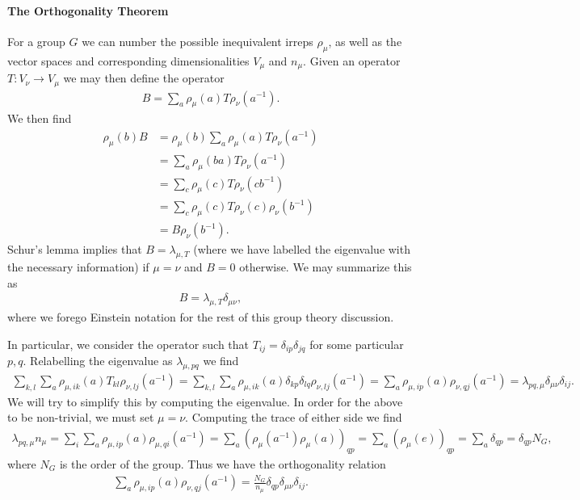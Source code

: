 \paragraph{The Orthogonality Theorem}
For a group $G$ we can number the possible inequivalent irreps $\rho_{\mu}$, as well as the vector spaces and corresponding dimensionalities $V_{\mu}$ and $n_{\mu}$. Given an operator $T: V_{\nu}\to V_{\mu}$ we may then define the operator
\begin{align*}
	B = \sum\limits_{a}\rho_{\mu}(a)T\rho_{\nu}(a^{-1}).
\end{align*}
We then find
\begin{align*}
	\rho_{\mu}(b)B &= \rho_{\mu}(b)\sum\limits_{a}\rho_{\mu}(a)T\rho_{\nu}(a^{-1}) \\
	               &= \sum\limits_{a}\rho_{\mu}(ba)T\rho_{\nu}(a^{-1}) \\
	               &= \sum\limits_{c}\rho_{\mu}(c)T\rho_{\nu}(cb^{-1}) \\
	               &= \sum\limits_{c}\rho_{\mu}(c)T\rho_{\nu}(c)\rho_{\nu}(b^{-1}) \\
	               &= B\rho_{\nu}(b^{-1}).
\end{align*}
Schur's lemma implies that $B = \lambda_{\mu, T}$ (where we have labelled the eigenvalue with the necessary information) if $\mu = \nu$ and $B = 0$ otherwise. We may summarize this as
\begin{align*}
	B = \lambda_{\mu, T}\delta_{\mu\nu},
\end{align*}
where we forego Einstein notation for the rest of this group theory discussion.

In particular, we consider the operator such that $T_{ij} = \delta_{ip}\delta_{jq}$ for some particular $p, q$. Relabelling the eigenvalue as $\lambda_{\mu, pq}$ we find
\begin{align*}
	\sum\limits_{k, l}\sum\limits_{a}\rho_{\mu, ik}(a)T_{kl}\rho_{\nu, lj}(a^{-1}) = \sum\limits_{k, l}\sum\limits_{a}\rho_{\mu, ik}(a)\delta_{kp}\delta_{lq}\rho_{\nu, lj}(a^{-1}) = \sum\limits_{a}\rho_{\mu, ip}(a)\rho_{\nu, qj}(a^{-1}) = \lambda_{pq, \mu}\delta_{\mu\nu}\delta_{ij}.
\end{align*}
We will try to simplify this by computing the eigenvalue. In order for the above to be non-trivial, we must set $\mu = \nu$. Computing the trace of either side we find
\begin{align*}
	\lambda_{pq, \mu}n_{\mu} = \sum\limits_{i}\sum\limits_{a}\rho_{\mu, ip}(a)\rho_{\mu, qi}(a^{-1}) = \sum\limits_{a}(\rho_{\mu}(a^{-1})\rho_{\mu}(a))_{qp} = \sum\limits_{a}(\rho_{\mu}(e))_{qp} = \sum\limits_{a}\delta_{qp} = \delta_{qp}N_{G},
\end{align*}
where $N_{G}$ is the order of the group. Thus we have the orthogonality relation
\begin{align*}
	\sum\limits_{a}\rho_{\mu, ip}(a)\rho_{\nu, qj}(a^{-1}) = \frac{N_{G}}{n_{\mu}}\delta_{qp}\delta_{\mu\nu}\delta_{ij}.
\end{align*}

